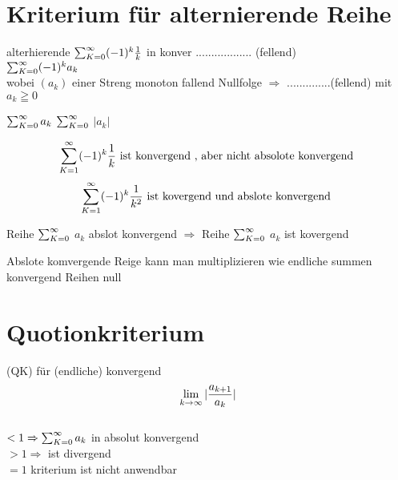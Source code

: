 \section{Kriterium für alternierende Reihe}
\begin{example}{alterhierende}
	$\sum_{K=0}^{\infty} (-1)^k \frac{1}{k}$ in konver .................. (fellend)\\
	$\sum_{K=0}^{\infty} (-1)^k a_k$\\
	wobei $(a_k)$ einer Streng monoton fallend Nullfolge $\Rightarrow$ ..............(fellend)
	mit $ a_k \geqq 0$
\end{example}
\begin{definition}[Reihe]
	
	 $\sum_{K=0}^{\infty}  a_k$   $\sum_{K=0}^{\infty} $ $|a_k|$ 
\end{definition}
\begin{example}

\[	\sum_{K=1}^{\infty} (-1)^k \frac{1}{k} \text{ ist konvergend , aber nicht absolote konvergend } \]
\[ \sum_{K=1}^{\infty} (-1)^k \frac{1}{k^2}  \text{ ist kovergend und abslote konvergend } \]
	
\end{example}
\begin{theorem}
Reihe $\sum_{K=0}^{\infty}$ $a_k$ abslot konvergend $\Rightarrow$ Reihe $\sum_{K=0}^{\infty}$ $a_k$ ist kovergend	
\end{theorem}
\begin{remark}
	
Abslote komvergende Reige kann man multiplizieren wie endliche summen konvergend Reihen null
\end{remark}
\section{Quotionkriterium}
(QK) für (endliche) konvergend\\
\[\lim\limits_{k \rightarrow \infty} |\frac{a_{k+1}}{a_k}|\] \\$< 1 \Rightarrow \sum_{K=0}^{\infty} a_k $ in absolut konvergend\\
$>1 \Rightarrow $ ist divergend\\
$=1 $ kriterium ist nicht anwendbar 

